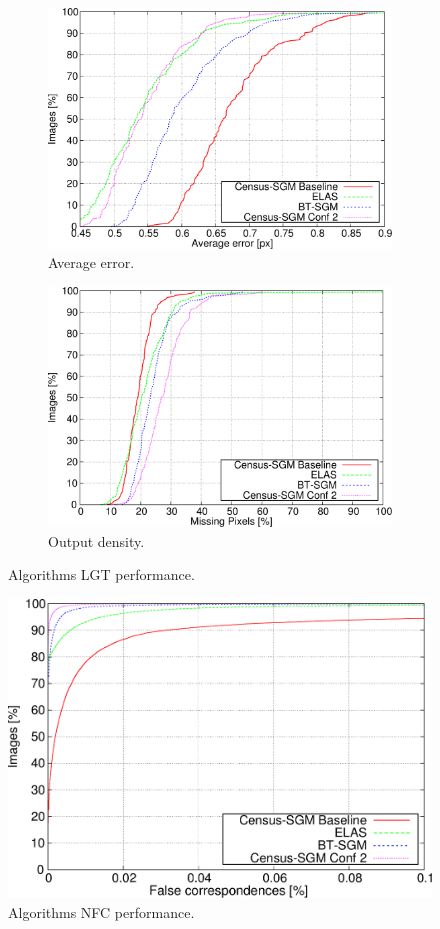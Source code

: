 \begin{figure}[h!]
  \ContinuedFloat
  \begin{subfigure}[h]{\textwidth}
    \centering
    \includegraphics[width=\textwidth, height=0.5\textwidth, trim=0 0 0 0, clip]{algo_avg_ee3}
    \caption{ Average error. }
    \label{fig:cp03_algorithms_LGT_avg}
  \end{subfigure}%

  \begin{subfigure}[h]{\textwidth}
    \centering
    \includegraphics[width=\textwidth, height=0.5\textwidth, trim=0 0 0 0,clip]{algo_dens_ee3}
    \caption{ Output density. }
    \label{fig:cp03_algorithms_LGT_dens}
  \end{subfigure}%
  \caption{ Algorithms LGT performance. }
\end{figure}

\begin{figure}[h!]
  \centering
  \includegraphics[width=\textwidth, height=0.5\textwidth, trim=0 0 0 0,clip]{algo_nfc_perc}
  \caption{  Algorithms NFC performance.}
  \label{fig:cp03_algorithms_NFC}
\end{figure}%

